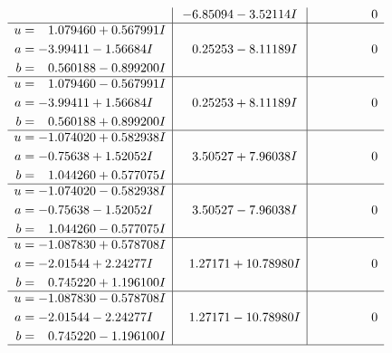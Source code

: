 \documentclass[1p]{elsarticle_modified}
\theoremstyle{definition}
\begin{document}
$$\begin{array}{c|c|c}
 & -6.85094 - 3.52114 I & \phantom{-0.000000 } 0 \\ \hline\begin{aligned}
u &= \phantom{-}1.079460 + 0.567991 I \\
a &= -3.99411 - 1.56684 I \\
b &= \phantom{-}0.560188 - 0.899200 I\end{aligned}
 & \phantom{-}0.25253 - 8.11189 I & \phantom{-0.000000 } 0 \\ \hline\begin{aligned}
u &= \phantom{-}1.079460 - 0.567991 I \\
a &= -3.99411 + 1.56684 I \\
b &= \phantom{-}0.560188 + 0.899200 I\end{aligned}
 & \phantom{-}0.25253 + 8.11189 I & \phantom{-0.000000 } 0 \\ \hline\begin{aligned}
u &= -1.074020 + 0.582938 I \\
a &= -0.75638 + 1.52052 I \\
b &= \phantom{-}1.044260 + 0.577075 I\end{aligned}
 & \phantom{-}3.50527 + 7.96038 I & \phantom{-0.000000 } 0 \\ \hline\begin{aligned}
u &= -1.074020 - 0.582938 I \\
a &= -0.75638 - 1.52052 I \\
b &= \phantom{-}1.044260 - 0.577075 I\end{aligned}
 & \phantom{-}3.50527 - 7.96038 I & \phantom{-0.000000 } 0 \\ \hline\begin{aligned}
u &= -1.087830 + 0.578708 I \\
a &= -2.01544 + 2.24277 I \\
b &= \phantom{-}0.745220 + 1.196100 I\end{aligned}
 & \phantom{-}1.27171 + 10.78980 I & \phantom{-0.000000 } 0 \\ \hline\begin{aligned}
u &= -1.087830 - 0.578708 I \\
a &= -2.01544 - 2.24277 I \\
b &= \phantom{-}0.745220 - 1.196100 I\end{aligned}
 & \phantom{-}1.27171 - 10.78980 I & \phantom{-0.000000 } 0\\
 \hline 
 \end{array}$$\newpage$$\begin{array}{c|c|c}  

\end{array}$$
\end{document}
